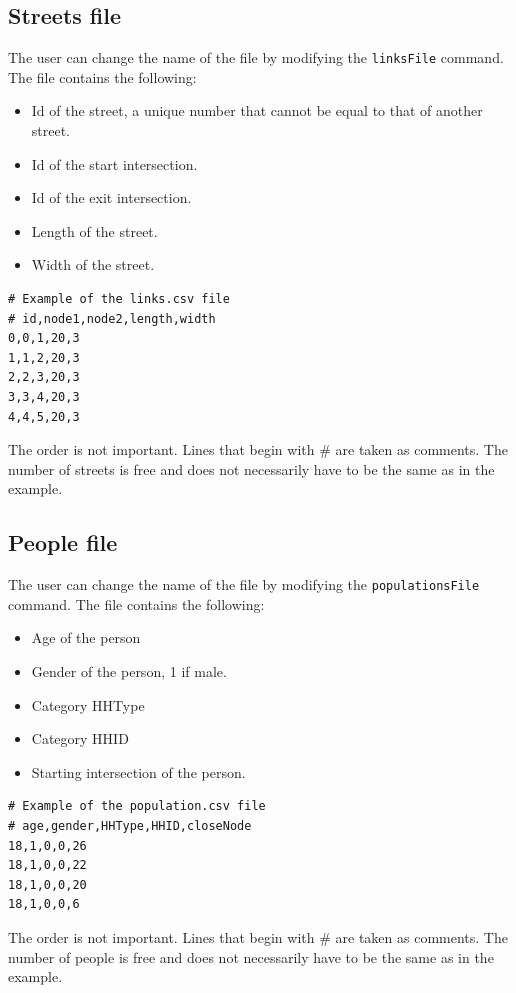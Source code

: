 \documentclass[12pt,a4paper]{book}
\newenvironment{csvblock}{\par\noindent\begin{minipage}{\linewidth}}{\end{minipage}\par}
\begin{document}
\subsection{Streets file}
The user can change the name of the file by modifying the \texttt{linksFile} command. The file
contains the following:
\begin{itemize}
  \item Id of the street, a unique number that cannot be equal to that of another street.
  \item Id of the start intersection.
  \item Id of the exit intersection.
  \item Length of the street.
  \item Width of the street.
\end{itemize}
\begin{csvblock}
\begin{lstlisting}[style=csvfile]
# Example of the links.csv file
# id,node1,node2,length,width
0,0,1,20,3
1,1,2,20,3
2,2,3,20,3
3,3,4,20,3
4,4,5,20,3
\end{lstlisting}
\end{csvblock}
The order is not important. Lines that begin with \# are taken as comments. The number of streets
is free and does not necessarily have to be the same as in the example.

\subsection{People file}
The user can change the name of the file by modifying the \texttt{populationsFile} command. The file
contains the following:
\begin{itemize}
  \item Age of the person
  \item Gender of the person, 1 if male.
  \item Category HHType
  \item Category HHID
  \item Starting intersection of the person.
\end{itemize}
\begin{csvblock}
\begin{lstlisting}[style=csvfile]
# Example of the population.csv file
# age,gender,HHType,HHID,closeNode
18,1,0,0,26
18,1,0,0,22
18,1,0,0,20
18,1,0,0,6
\end{lstlisting}
\end{csvblock}
The order is not important. Lines that begin with \# are taken as comments. The number of people is
free and does not necessarily have to be the same as in the example.
\end{document}
